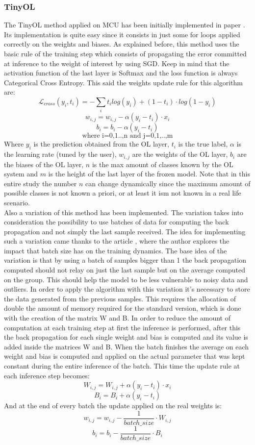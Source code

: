 \documentclass[12pt]{report}
\begin{document}
\subsubsection{TinyOL}

The TinyOL method applied on MCU has been initially implemented in paper \cite{ren2021tinyol}. Its implementation is quite easy since it consists in just some for loops applied correctly on the weights and biases. As explained before, this method uses the basic rule of the training step which consists of propagating the error committed at inference to the weight of interest by using SGD. Keep in mind that the activation function of the last layer is Softmax and the loss function is always Categorical Cross Entropy. This said the weights update rule for this algorithm are:
%
\[ \mathcal{L}_{cross}(y_i, t_i)= - \sum_i t_i log(y_i) + (1-t_i)\cdot log(1-y_i)  \]
\[    w_{i,j} = w_{i,j} - \alpha (y_i - t_i) \cdot x_i \]
\[    b_i = b_i - \alpha (y_i - t_i) \]
\[    \text{where i=0,1..,n  and  j=0,1,..,m} \]
%
Where $y_i$ is the prediction obtained from the OL layer, $t_i$ is the true label, $\alpha$ is the learning rate (tuned by the user), $w_{i,j}$ are the weights of the OL layer, $b_i$ are the biases of the OL layer, $n$ is the max amount of classes known by the OL system and $m$ is the height of the last layer of the frozen model. Note that in this entire study the number $n$ can change dynamically since the maximum amount of possible classes is not known a priori, or at least it ism not known in a real life scenario. \\
Also a variation of this method has been implemented. The variation takes into consideration the possibility to use batches of data for computing the back propagation and not simply the last sample received. The idea for implementing such a variation came thanks to the article \cite{batch_size_medium}, where the author explores the impact that batch size has on the training dynamics. The base idea of the variation is that by using a batch of samples bigger than 1 the back propagation computed should not relay on just the last sample but on the average computed on the group. This should help the model to be less vulnerable to noisy data and outliers. In order to apply the algorithm with this variation it's necessary to store the data generated from the previous samples. This requires the allocation of double the amount of memory required for the standard version, which is done with the creation of the matrix W and B. In order to reduce the amount of computation at each training step at first the inference is performed, after this the back propagation for each single weight and bias is computed and its value is added inside the matrices W and B. When the batch finishes the average on each weight and bias is computed and applied on the actual parameter that was kept constant during the entire inference of the batch. This time the update rule at each inference step becomes:
    \[     W_{i,j} = W_{i,j} + \alpha (y_i - t_i) \cdot x_i\]
    \[     B_i = B_i + \alpha  (y_i - t_i) \]
And at the end of every batch the update applied on the real weights is:
    \[     w_{i,j} = w_{i,j} - \frac{1}{batch\_size} \cdot W_{i,j} \] 
    \[     b_i = b_i - \frac{1}{batch\_size} \cdot B_i \]
    
\end{document}
